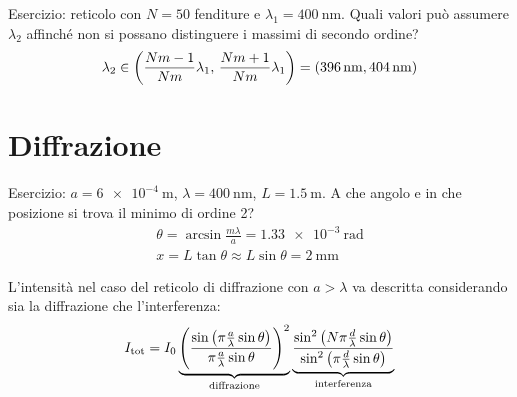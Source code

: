 Esercizio: reticolo con $N = 50$ fenditure e $\lambda_1 = \qty{400}{\nano\metre}$.
Quali valori può assumere $\lambda_2$ affinché non si possano distinguere i massimi di secondo ordine?
\begin{equation}
    \lambda_2 \in \left( \frac{N m - 1}{N m} \lambda_1, \, \frac{N m + 1}{N m} \lambda_1 \right)
    = \left( \qty{396}{\nano\metre}, \qty{404}{\nano\metre} \right)
\end{equation}

\section{Diffrazione}






Esercizio: $a = \qty{6e-4}{\metre}$, $\lambda = \qty{400}{\nano\metre}$, $L = \qty{1.5}{\metre}$.
A che angolo e in che posizione si trova il minimo di ordine 2?
\begin{gather}
    \theta = \arcsin \frac{m \lambda}{a} = \qty{1.33e-3}{\radian} \\
    x = L \tan \theta \approx L \sin \theta = \qty{2}{\milli\metre}
\end{gather}

L'intensità nel caso del reticolo di diffrazione con $a > \lambda$ va descritta considerando sia la diffrazione che l'interferenza:
\begin{equation}
    I_\text{tot} = I_0
    \underbrace{\left( \frac{\sin\left( \pi \frac{a}{\lambda} \sin\theta \right)}{\pi \frac{a}{\lambda} \sin\theta} \right)^2}_\text{diffrazione}
    \underbrace{\frac{\sin^2 \left( N \pi \frac{d}{\lambda} \sin \theta \right)}{\sin^2 \left( \pi \frac{d}{\lambda} \sin \theta \right)}}_\text{interferenza}
\end{equation}

